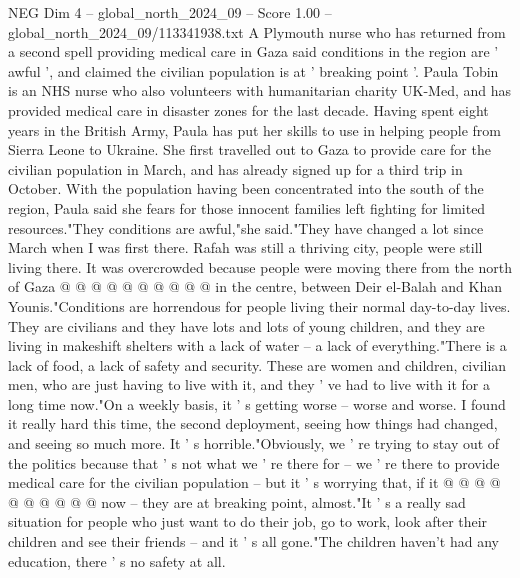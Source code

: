 \begin{textsample}{NEG Dim 4 – global\_north\_2024\_09 – Score 1.00 – global\_north\_2024\_09/113341938.txt}  \label{ex:f4_neg_141}
A Plymouth nurse who has returned from a second spell providing medical care in Gaza said conditions in the region are ' awful ', and claimed the civilian population is at ' breaking point '.
Paula Tobin is an NHS nurse who also volunteers with humanitarian charity UK-Med, and has provided medical care in disaster zones for the last decade.
Having spent eight years in the British Army, Paula has put her skills to use in helping people from Sierra Leone to Ukraine.
She first travelled out to Gaza to provide care for the civilian population in March, and has already signed up for a third trip in October.
With the population having been concentrated into the south of the region, Paula said she fears for those innocent families left fighting for limited resources."They conditions are awful,"she said."They have changed a lot since March when I was first there.
Rafah was still a thriving city, people were still living there.
It was overcrowded because people were moving there from the north of Gaza @ @ @ @ @ @ @ @ @ @ in the centre, between Deir el-Balah and Khan Younis."Conditions are horrendous for people living their normal day-to-day lives.
They are civilians and they have lots and lots of young children, and they are living in makeshift shelters with a lack of water -- a lack of everything."There is a lack of food, a lack of safety and security.
These are women and children, civilian men, who are just having to live with it, and they ' ve had to live with it for a long time now."On a weekly basis, it ' s getting worse -- worse and worse.
I found it really hard this time, the second deployment, seeing how things had changed, and seeing so much more.
It ' s horrible."Obviously, we ' re trying to stay out of the politics because that ' s not what we ' re there for -- we ' re there to provide medical care for the civilian population -- but it ' s worrying that, if it @ @ @ @ @ @ @ @ @ @ now -- they are at breaking point, almost."It ' s a really sad situation for people who just want to do their job, go to work, look after their children and see their friends -- and it ' s all gone."The children haven't had any education, there ' s no safety at all.

\end{textsample}
